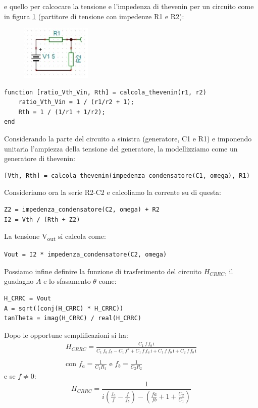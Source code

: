 e quello per calcocare la tensione e l'impedenza di thevenin per un circuito come in figura \ref{fig:partitore} (partitore di tensione con impedenze R1 e R2):
\begin{figure}[H]
  \caption{}
  \centering
    \includegraphics[width=0.3\textwidth]{settimana_2/immagini/partitore.jpg}
    \label{fig:partitore}
\end{figure}
\begin{lstlisting}[frame=single]
function [ratio_Vth_Vin, Rth] = calcola_thevenin(r1, r2)
    ratio_Vth_Vin = 1 / (r1/r2 + 1);
    Rth = 1 / (1/r1 + 1/r2);
end
\end{lstlisting}

Considerando la parte del circuito a sinistra (generatore, C1 e R1) e imponendo unitaria l'ampiezza della tensione del generatore, la modellizziamo come un generatore di thevenin:
\begin{lstlisting}[frame=single]
[Vth, Rth] = calcola_thevenin(impedenza_condensatore(C1, omega), R1)
\end{lstlisting}

Consideriamo ora la serie R2-C2 e calcoliamo la corrente su di questa:
\begin{lstlisting}[frame=single]
Z2 = impedenza_condensatore(C2, omega) + R2
I2 = Vth / (Rth + Z2)
\end{lstlisting}

La tensione V\textsubscript{out} si calcola come:
\begin{lstlisting}[frame=single]
Vout = I2 * impedenza_condensatore(C2, omega)
\end{lstlisting}

Possiamo infine definire la funzione di trasferimento del circuito $H_{CRRC}$, il guadagno $A$ e lo sfasamento $\theta$ come:
\begin{lstlisting}[frame=single]
H_CRRC = Vout
A = sqrt((conj(H_CRRC) * H_CRRC))
tanTheta = imag(H_CRRC) / real(H_CRRC)
\end{lstlisting}

Dopo le opportune semplificazioni si ha:
\begin{equation}
\begin{array}{l}
    H_{CRRC} = \frac{C_1 \,f\,f_b \,\mathrm{i}}{C_1 \,f_a \,f_b -C_1 \,f^2 +C_1 \,f\,f_a \,\mathrm{i}+C_1 \,f\,f_b \,\mathrm{i}+C_2 \,f\,f_b \,\mathrm{i}}\\\\
    \text{con } f_a = \frac{1}{C_1 R_1} \text{ e } f_b = \frac{1}{C_2 R_2}
\end{array}
\end{equation}
 e se $f \neq 0$:
\begin{equation}
    H_{CRRC} = \frac{1}{i(\frac{f_a}{f} - \frac{f}{f_b}) - (\frac{fa}{fb} + 1 + \frac{C_2}{C_1})}
\end{equation}

